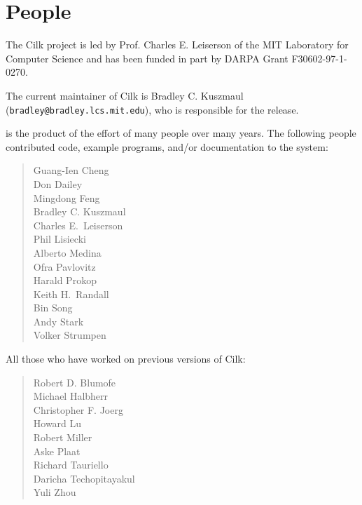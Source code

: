 \chapter{People}
\label{app:people}

The Cilk project is led by Prof. Charles E. Leiserson of the MIT
Laboratory for Computer Science and has been funded in part by DARPA
Grant F30602-97-1-0270.

The current maintainer of Cilk is Bradley C. Kuszmaul
(\texttt{bradley@bradley.lcs.mit.edu}), who is responsible for the
{\sysnameversion} release.

{\sysnameversion} is the product of the effort of many people over
many years.  The following people contributed code, example programs,
and/or documentation to the {\sysnameversion} system:

\begin{quote}
\noindent
Guang-Ien Cheng\\
Don Dailey\\
Mingdong Feng\\
Bradley C. Kuszmaul\\
Charles E.\ Leiserson\\
Phil Lisiecki\\
Alberto Medina\\
Ofra Pavlovitz\\
Harald Prokop\\
Keith H.\ Randall\\
Bin Song\\
Andy Stark\\
Volker Strumpen\\
\end{quote}

\noindent All those who have worked on previous versions of Cilk:
\begin{quote}
\noindent
Robert D. Blumofe\\
Michael Halbherr\\
Christopher F. Joerg\\
Howard Lu\\
Robert Miller\\
Aske Plaat\\
Richard Tauriello\\
Daricha Techopitayakul\\
Yuli Zhou\\
\end{quote}

\pagebreak[3]

